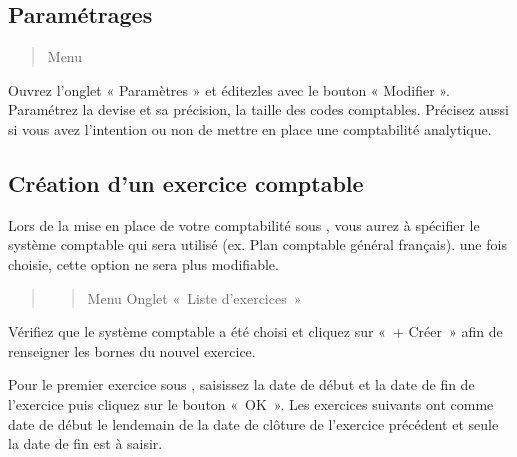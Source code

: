 \documentclass[a4paper,10pt,oneside,french]{sphinxmanual}
\begin{document}
\subsection{Paramétrages}
\label{\detokenize{accounting/fiscalyear:parametrages}}\begin{quote}

Menu 
\end{quote}

Ouvrez l’onglet « Paramètres » et éditez\sphinxhyphen{}les avec le bouton « Modifier ». Paramétrez la devise et sa précision, la taille des codes comptables. Précisez aussi si vous avez l’intention ou non de mettre en place une comptabilité analytique.
\begin{quote}

\noindent{}
\end{quote}


\subsection{Création d’un exercice comptable}
\label{\detokenize{accounting/fiscalyear:creation-d-un-exercice-comptable}}
Lors de la mise en place de votre comptabilité sous , vous aurez à spécifier le système comptable qui sera utilisé (ex. Plan comptable général français).  une fois choisie, cette option ne sera plus modifiable.
\begin{quote}
\begin{quote}

Menu  \sphinxhyphen{} Onglet « Liste d’exercices »
\end{quote}

\noindent{}
\end{quote}

Vérifiez que le système comptable a été choisi et cliquez sur « + Créer » afin de renseigner les bornes du nouvel exercice.
\begin{quote}

\noindent{}
\end{quote}

Pour le premier exercice sous , saisissez la date de début et la date de fin de l’exercice puis cliquez sur le bouton « OK ». Les exercices suivants ont comme date de début le lendemain de la date de clôture de l’exercice précédent et seule la date de fin est à saisir.
\end{document}
